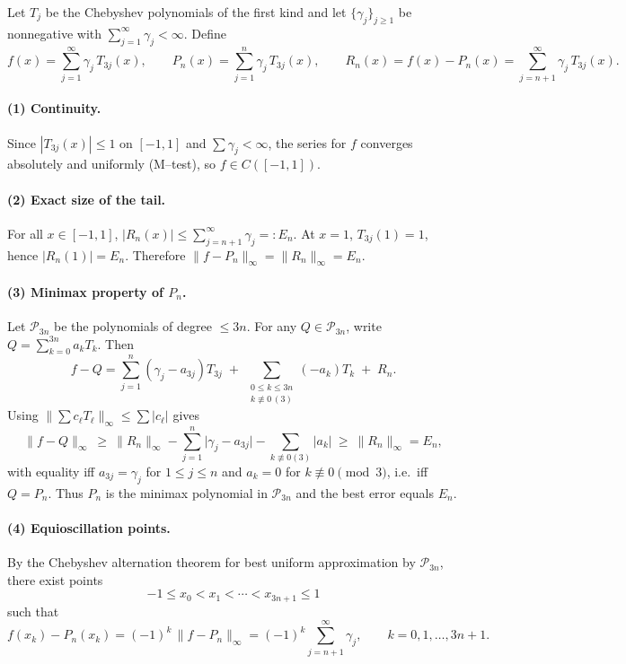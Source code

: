 \documentclass[11pt,a4paper]{article}
\theoremstyle{definition}
\theoremstyle{definition}
\theoremstyle{plain}
\theoremstyle{remark}
\begin{document}
Let \(T_j\) be the Chebyshev polynomials of the first kind and let \(\{\gamma_j\}_{j\ge1}\) be
nonnegative with \(\sum_{j=1}^\infty \gamma_j<\infty\).
Define
\[
f(x)=\sum_{j=1}^\infty \gamma_j\,T_{3j}(x),\qquad
P_n(x)=\sum_{j=1}^{n} \gamma_j\,T_{3j}(x),\qquad
R_n(x)=f(x)-P_n(x)=\sum_{j=n+1}^\infty \gamma_j\,T_{3j}(x).
\]

\paragraph{(1) Continuity.}
Since \(|T_{3j}(x)|\le 1\) on \([-1,1]\) and \(\sum\gamma_j<\infty\),
the series for \(f\) converges absolutely and uniformly (M–test), so \(f\in C([-1,1])\).

\paragraph{(2) Exact size of the tail.}
For all \(x\in[-1,1]\),
\(|R_n(x)|\le \sum_{j=n+1}^\infty \gamma_j=:E_n\).
At \(x=1\), \(T_{3j}(1)=1\), hence \(|R_n(1)|=E_n\).
Therefore \(\|f-P_n\|_\infty=\|R_n\|_\infty=E_n\).

\paragraph{(3) Minimax property of \(P_n\).}
Let \(\mathcal P_{3n}\) be the polynomials of degree \(\le 3n\).
For any \(Q\in \mathcal P_{3n}\), write \(Q=\sum_{k=0}^{3n} a_k T_k\).
Then
\[
f-Q=\sum_{j=1}^{n}(\gamma_j-a_{3j})T_{3j}
\;+\;\sum_{\substack{0\le k\le 3n\\k\not\equiv 0\,(3)}}(-a_k)T_k
\;+\;R_n .
\]
Using \(\bigl\|\sum c_\ell T_\ell\bigr\|_\infty\le\sum |c_\ell|\) gives
\[
\|f-Q\|_\infty\ \ge\ \|R_n\|_\infty
- \sum_{j=1}^{n}\bigl|\gamma_j-a_{3j}\bigr|
- \sum_{k\not\equiv0(3)}|a_k|
\ \ge\ \|R_n\|_\infty=E_n,
\]
with equality iff \(a_{3j}=\gamma_j\) for \(1\le j\le n\) and \(a_k=0\) for \(k\not\equiv0\pmod3\), i.e.\ iff \(Q=P_n\).
Thus \(P_n\) is the minimax polynomial in \(\mathcal P_{3n}\) and the best error equals \(E_n\).

\paragraph{(4) Equioscillation points.}
By the Chebyshev alternation theorem for best uniform approximation by \(\mathcal P_{3n}\),
there exist points
\[
-1\le x_0<x_1<\cdots<x_{3n+1}\le 1
\]
such that
\[
f(x_k)-P_n(x_k)=(-1)^k\,\|f-P_n\|_\infty
=(-1)^k\sum_{j=n+1}^\infty \gamma_j,\qquad k=0,1,\dots,3n+1.
\]
\end{document}
